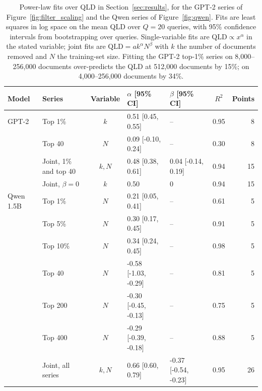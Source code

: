 \begin{table}[t]
\centering
\caption{Power-law fits over QLD in Section~\ref{sec:results}, for the GPT-2 series of Figure~\ref{fig:filter_scaling} and the Qwen series of Figure~\ref{fig:qwen}. Fits are least squares in log space on the mean QLD over $Q=20$ queries, with 95\% confidence intervals from bootstrapping over queries. Single-variable fits are $\mathrm{QLD} \propto x^{\alpha}$ in the stated variable; joint fits are $\mathrm{QLD} = a k^{\alpha} N^{\beta}$ with $k$ the number of documents removed and $N$ the training-set size. Fitting the GPT-2 top-1\% series on 8,000--256,000 documents over-predicts the QLD at 512,000 documents by 15\%; on 4,000--256,000 documents by 34\%.}
\label{tab:fits}
\small
\begin{tabular}{@{}llcllcr@{}}
\toprule
Model & Series & Variable & $\alpha$ [95\% CI] & $\beta$ [95\% CI] & $R^2$ & Points \\
\midrule
GPT-2 & Top 1\% & $k$ & 0.51 [0.45, 0.55] & -- & 0.95 & 8 \\
 & Top 40 & $N$ & 0.09 [-0.10, 0.24] & -- & 0.30 & 8 \\
 & Joint, 1\% and top 40 & $k, N$ & 0.48 [0.38, 0.61] & 0.04 [-0.14, 0.19] & 0.94 & 15 \\
 & Joint, $\beta = 0$ & $k$ & 0.50 & 0 & 0.94 & 15 \\
\addlinespace
Qwen 1.5B & Top 1\% & $N$ & 0.21 [0.05, 0.41] & -- & 0.61 & 5 \\
 & Top 5\% & $N$ & 0.30 [0.17, 0.45] & -- & 0.91 & 5 \\
 & Top 10\% & $N$ & 0.34 [0.24, 0.45] & -- & 0.98 & 5 \\
 & Top 40 & $N$ & -0.58 [-1.03, -0.29] & -- & 0.81 & 5 \\
 & Top 200 & $N$ & -0.30 [-0.45, -0.13] & -- & 0.75 & 5 \\
 & Top 400 & $N$ & -0.29 [-0.39, -0.18] & -- & 0.88 & 5 \\
 & Joint, all series & $k, N$ & 0.66 [0.60, 0.79] & -0.37 [-0.54, -0.23] & 0.95 & 26 \\
\bottomrule
\end{tabular}
\end{table}

